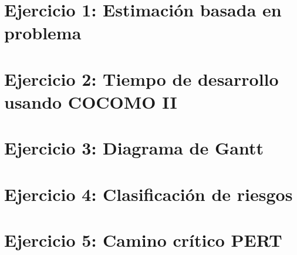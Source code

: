 

\section{Ejercicio 1: Estimación basada en problema}\label{sec:ejercicio-1:-estimacion-basada-en-problema}



\section{Ejercicio 2: Tiempo de desarrollo usando COCOMO II}\label{sec:ejercicio-2:-tiempo-de-desarrollo-usando-cocomo-ii}



\section{Ejercicio 3: Diagrama de Gantt}\label{sec:ejercicio-3:-diagrama-de-gantt}



\section{Ejercicio 4: Clasificación de riesgos}\label{sec:ejercicio-4:-clasificacion-de-riesgos}



\section{Ejercicio 5: Camino crítico PERT}\label{sec:ejercicio-5:-camino-critico-pert}


